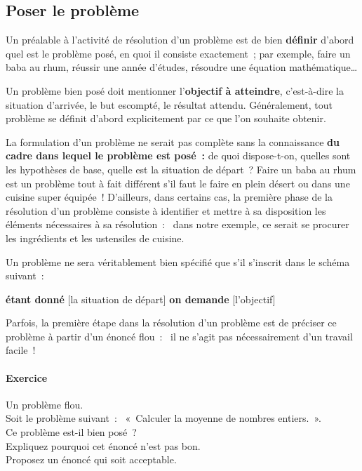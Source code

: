		\subsection{Poser le problème}
		
			Un préalable à l’activité de résolution d’un problème 
			est de bien \textbf{définir} d’abord 
			quel est le problème posé, 
			en quoi il consiste exactement~; 
			par exemple, faire un baba au rhum, 
			réussir une année d’études, 
			résoudre une équation mathématique\dots
			
			Un problème bien posé doit mentionner 
			l’\textbf{objectif à atteindre},
			c’est-à-dire la situation d’arrivée, 
			le but escompté, le résultat attendu. 
			Généralement, tout problème se définit d’abord explicitement
			par ce que l’on souhaite obtenir.
			
			La formulation d’un problème ne serait pas complète 
			sans la connaissance
			\textbf{du cadre dans lequel le problème est posé~:}
			de quoi dispose-t-on, quelles sont les hypothèses de base, 
			quelle est la situation de départ~? 
			Faire un baba au rhum est un problème tout à fait différent 
			s’il faut le faire en plein désert 
			ou dans une cuisine super équipée~! 
			D’ailleurs, dans certains cas, 
			la première phase de la résolution d’un problème 
			consiste à identifier et mettre à sa disposition 
			les éléments nécessaires à sa résolution~:~
			dans notre exemple, 
			ce serait se procurer les ingrédients 
			et les ustensiles de cuisine.
		
			Un problème ne sera véritablement bien spécifié 
			que s’il s’inscrit dans le schéma suivant~:
			
			\begin{center}
			\begin{Ovalbox}
				{\textbf{étant donné} [la situation de départ] 
				\textbf{on demande} [l’objectif]}
			\end{Ovalbox}
			\end{center}
		
			Parfois, la première étape dans la résolution d’un problème 
			est de préciser ce problème à partir d’un énoncé flou~:~
			il ne s’agit pas nécessairement d’un travail facile~!
	
			\begin{Emphase}
				\paragraph{Exercice} Un problème flou.\\
				Soit le problème suivant~:~
				«~Calculer la moyenne de nombres entiers.~».\\
				Ce problème est-il bien posé~?\\
				Expliquez pourquoi cet énoncé n'est pas bon. \\
				Proposez un énoncé qui soit acceptable.
			\end{Emphase}
			

